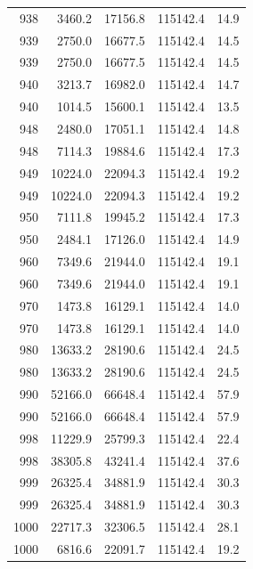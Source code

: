 \begin{longtable}{rrrrr}
    938 & \num{3460.2} & \num{17156.8} & \num{115142.4} & 14.9 \\
    939 & \num{2750.0} & \num{16677.5} & \num{115142.4} & 14.5 \\
    939 & \num{2750.0} & \num{16677.5} & \num{115142.4} & 14.5 \\
    940 & \num{3213.7} & \num{16982.0} & \num{115142.4} & 14.7 \\
    940 & \num{1014.5} & \num{15600.1} & \num{115142.4} & 13.5 \\
    948 & \num{2480.0} & \num{17051.1} & \num{115142.4} & 14.8 \\
    948 & \num{7114.3} & \num{19884.6} & \num{115142.4} & 17.3 \\
    949 & \num{10224.0} & \num{22094.3} & \num{115142.4} & 19.2 \\
    949 & \num{10224.0} & \num{22094.3} & \num{115142.4} & 19.2 \\
    950 & \num{7111.8} & \num{19945.2} & \num{115142.4} & 17.3 \\
    950 & \num{2484.1} & \num{17126.0} & \num{115142.4} & 14.9 \\
    960 & \num{7349.6} & \num{21944.0} & \num{115142.4} & 19.1 \\
    960 & \num{7349.6} & \num{21944.0} & \num{115142.4} & 19.1 \\
    970 & \num{1473.8} & \num{16129.1} & \num{115142.4} & 14.0 \\
    970 & \num{1473.8} & \num{16129.1} & \num{115142.4} & 14.0 \\
    980 & \num{13633.2} & \num{28190.6} & \num{115142.4} & 24.5 \\
    980 & \num{13633.2} & \num{28190.6} & \num{115142.4} & 24.5 \\
    990 & \num{52166.0} & \num{66648.4} & \num{115142.4} & 57.9 \\
    990 & \num{52166.0} & \num{66648.4} & \num{115142.4} & 57.9 \\
    998 & \num{11229.9} & \num{25799.3} & \num{115142.4} & 22.4 \\
    998 & \num{38305.8} & \num{43241.4} & \num{115142.4} & 37.6 \\
    999 & \num{26325.4} & \num{34881.9} & \num{115142.4} & 30.3 \\
    999 & \num{26325.4} & \num{34881.9} & \num{115142.4} & 30.3 \\
    1000 & \num{22717.3} & \num{32306.5} & \num{115142.4} & 28.1 \\
    1000 & \num{6816.6} & \num{22091.7} & \num{115142.4} & 19.2 \\

\end{longtable}
